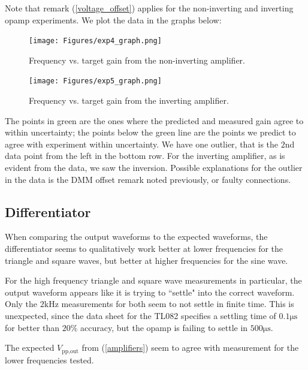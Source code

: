 \documentclass[11pt]{article}
\begin{document}
Note that remark (\ref{voltage_offset}) applies for the
non-inverting and inverting opamp experiments.
We plot the data in the graphs below:

\begin{figure}[H]
	\centering
	 \begin{minipage}{0.45\textwidth}
		 \centering
		 \texttt{[image: Figures/exp4\_graph.png]} %
		 \caption{Frequency vs. target gain from the non-inverting amplifier.}
	\end{minipage}\hfill
    \begin{minipage}{0.45\textwidth}
	    \centering
	    \texttt{[image: Figures/exp5\_graph.png]} %
		 \caption{Frequency vs. target gain from the inverting amplifier.}
    \end{minipage}
\end{figure}

The points in green are the ones where the predicted
and measured gain agree to within uncertainty; the points
below the green line are the points we predict to agree
with experiment within uncertainty. We have one outlier,
that is the $2$nd data point from the left in the bottom row.
For the inverting amplifier, as is evident from the data,
we saw the inversion. Possible explanations for the outlier
in the data is the DMM offset remark noted previously, or
faulty connections.

\subsection{Differentiator}
When comparing the output waveforms to the expected waveforms, the 
differentiator seems to qualitatively work better at lower frequencies for the 
triangle and square waves, but better at higher frequencies for the sine wave.

For the high frequency triangle and square wave measurements in particular, the
output waveform appears like it is trying to ``settle" into the correct 
waveform. Only the $2 \si{\kilo\hertz}$ measurements for both seem to not 
settle in finite time. This is unexpected, since the data sheet for the TL082
specifies a settling time of $0.1 \si{\micro\second}$ for better than $20 \%$
accuracy, but the opamp is failing to settle in $500 \si{\micro\second}$.

The expected $V_\text{pp,out}$ from (\ref{amplifiers}) 
seem to agree with measurement for the lower frequencies tested.
\end{document}
